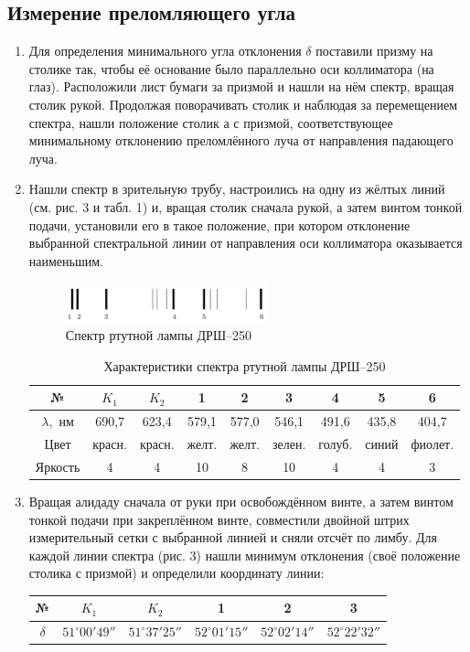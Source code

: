 \documentclass[a4paper, 12pt]{article}%
\begin{document}
	\subsection*{Измерение преломляющего угла}
	\begin{enumerate}
		\item Для определения минимального угла отклонения $\delta$ поставили призму на столике так, чтобы её основание было параллельно оси коллиматора (на глаз). Расположили лист бумаги за призмой и нашли на нём спектр, вращая столик рукой. Продолжая поворачивать столик и наблюдая за перемещением спектра, нашли положение столик а с призмой, соответствующее минимальному отклонению преломлённого луча от направления падающего луча.
		
		\item Нашли спектр в зрительную трубу, настроились на одну из жёлтых линий (см. рис. 3 и табл. 1) и, вращая столик сначала рукой, а затем винтом тонкой подачи, установили его в такое положение, при котором отклонение выбранной спектральной линии от направления оси коллиматора оказывается наименьшим.		
		\begin{figure}[h]
			\begin{center}
				\includegraphics[width = 0.55\textwidth]{pic/443-3.png}
				\caption{Спектр ртутной лампы ДРШ--250}
			\end{center}
		\end{figure}
	\begin{table}[]
		\centering
		\begin{tabular}{|c|c|c|c|c|c|c|c|c|}
			\hline
			№ & $K_1$ & $K_2$ & 1 & 2 & 3 & 4 & 5 & 6 \\ \hline
			$\lambda,$ нм & 690,7 & 623,4 & 579,1 & 577,0 & 546,1 & 491,6 & 435,8 & 404,7 \\ \hline
			Цвет &красн.&красн.& желт. & желт. & зелен. & голуб. & синий & фиолет. \\ \hline
			Яркость & 4 & 4&10 & 8 & 10 & 4 & 4 & 3 \\ \hline
		\end{tabular}
		\caption{Характеристики спектра ртутной лампы ДРШ--250}
		\label{tab:my-table}
	\end{table}
	\item Вращая алидаду сначала от руки при освобождённом винте, а затем винтом тонкой подачи при закреплённом винте, совместили двойной штрих измерительный сетки с выбранной линией и сняли отсчёт по лимбу. Для каждой линии спектра (рис. 3) нашли минимум отклонения (своё положение столика с призмой) и определили координату линии:
	\begin{center}
		\centering
		\begin{tabular}{|c|c|c|c|c|c|}
			\hline
			№ & $K_1$ & $K_2$ & 1 & 2 & 3  \\ \hline
			$\delta$ & $51^\circ00'49''$ & $51^\circ37'25''$ & $52^\circ01'15''$ & $52^\circ02'14''$ & $52^\circ22'32''$ \\ \hline
		\end{tabular}
	

\end{center}
\end{enumerate}
\end{document}
